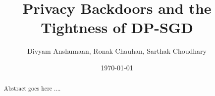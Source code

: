 \documentclass[11pt]{article}
\title{Privacy Backdoors and the Tightness of DP-SGD}
\author{Divyam Anshumaan, Ronak Chauhan, Sarthak Choudhary
}
\date{\today}
\begin{document}
\maketitle

\begin{abstract}
Abstract goes here ....
\end{abstract}







\end{document}
